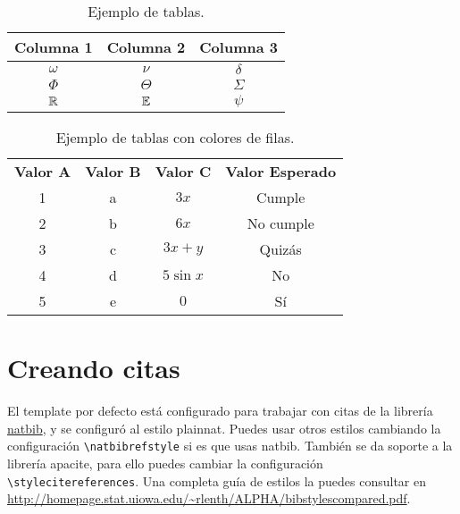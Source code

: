 	\begin{table}[H] %
		\centering
		\caption{Ejemplo de tablas.}
		\begin{tabular}{ccc}
			\hline
			\textbf{Columna 1} & \textbf{Columna 2} & \textbf{Columna 3} \bigstrut\\
			\hline
			$\omega$ & $\nu$ & $\delta$ \bigstrut[t]\\
			$\Phi$ & $\Theta$ & $\varSigma$ \\
			$\mathbb{R}$ & $\mathbb{E}$ & $\psi$ \\
			\hline
		\end{tabular}
		\label{tab:tabla-1}
	\end{table}
	
	\enabletablerowcolor
	\begin{table}[H]
		\centering
		\caption{Ejemplo de tablas con colores de filas.}
		\begin{tabular}{ccccc}
			\rowcolor[rgb]{ .749,  .749,  .749} \textbf{Valor A} & \textbf{Valor B} & \textbf{Valor C} & \multicolumn{2}{c}{\textbf{Valor Esperado}} \\
			1     & a     & $3x$  & \multicolumn{2}{c}{Cumple} \\
			2     & b     & $6x$  & \multicolumn{2}{c}{No cumple} \\
			3     & c     & $3x+y$ & \multicolumn{2}{c}{Quizás} \\
			4     & d     & $5\sin x$ & \multicolumn{2}{c}{No} \\
			5     & e     & $0$ & \multicolumn{2}{c}{Sí} \\
		\end{tabular}
	\end{table}
	\disabletablerowcolor
	
\section{Creando citas}

El template por defecto está configurado para trabajar con citas de la librería \href{https://www.ctan.org/pkg/natbib}{natbib}, y se configuró al estilo plainnat. Puedes usar otros estilos cambiando la configuración \texttt{\textbackslash natbibrefstyle} si es que usas natbib. También se da soporte a la librería apacite, para ello puedes cambiar la configuración \texttt{\textbackslash stylecitereferences}. Una completa guía de estilos la puedes consultar en \url{http://homepage.stat.uiowa.edu/~rlenth/ALPHA/bibstylescompared.pdf}. \\

